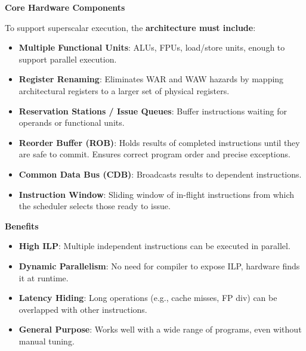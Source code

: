 \highspace
\begin{flushleft}
    \textcolor{Green3}{ \textbf{Core Hardware Components}}
\end{flushleft}
To support superscalar execution, the \textbf{architecture must include}:
\begin{itemize}
    \item \textbf{Multiple Functional Units}: ALUs, FPUs, load/store units, enough to support parallel execution.
  
    \item \textbf{Register Renaming}: Eliminates WAR and WAW hazards by mapping architectural registers to a larger set of physical registers.
  
    \item \textbf{Reservation Stations / Issue Queues}: Buffer instructions waiting for operands or functional units.
  
    \item \textbf{Reorder Buffer (ROB)}: Holds results of completed instructions until they are safe to commit. Ensures correct program order and precise exceptions.
  
    \item \textbf{Common Data Bus (CDB)}: Broadcasts results to dependent instructions.
  
    \item \textbf{Instruction Window}: Sliding window of in-flight instructions from which the scheduler selects those ready to issue.
\end{itemize}

\highspace
\begin{flushleft}
    \textcolor{Green3}{ \textbf{Benefits}}
\end{flushleft}
\begin{itemize}[label=\textcolor{Green3}{}]
    \item \textcolor{Green3}{\textbf{High ILP}}: Multiple independent instructions can be executed in parallel.
    \item \textcolor{Green3}{\textbf{Dynamic Parallelism}}: No need for compiler to expose ILP, hardware finds it at runtime.
    \item \textcolor{Green3}{\textbf{Latency Hiding}}: Long operations (e.g., cache misses, FP div) can be overlapped with other instructions.
    \item \textcolor{Green3}{\textbf{General Purpose}}: Works well with a wide range of programs, even without manual tuning.
\end{itemize}

